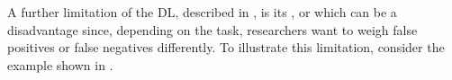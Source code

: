 A further limitation of the \ac{DL}, described in \cite{9338261}, is its , or which can be a disadvantage since, depending on the task, researchers want to weigh false positives or false negatives differently. To illustrate this limitation, consider the example shown in .
\begin{figure}[H]%
  \centering

\end{figure}
